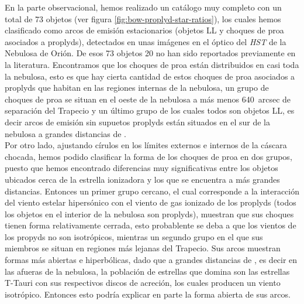 %


%

\label{chap:conclu}

En la parte observacional, hemos realizado un catálogo muy completo  con un total de 73 objetos (ver figura \ref{fig:bow-proplyd-star-ratios}), los cuales hemos clasificado como arcos de emisión estacionarios (objetos LL y choques de proa asociados a proplyds), detectados en unas imágenes en el óptico del \textit{HST} de la Nebulosa de Orión. De esos 73 objetos 20 no han sido reportados previamente en la literatura. Encontramos que los choques de proa están distribuidos en casi toda la nebulosa, esto es que hay cierta cantidad de  estos choques de proa asociados a proplyds que habitan en las regiones internas de la nebulosa, un grupo de choques de proa se situan en el oeste de la nebulosa a más menos 640~arcsec de separación del Trapecio y un último  grupo de los cuales todos son objetos LL, es decir arcos de emisión sin supuetos proplyds están situados en el sur de la nebulosa a grandes distancias de \thC{}.\\      

Por otro lado, ajustando círulos en los límites externos e internos de la cáscara chocada, hemos podido clasificar la forma de los choques de proa en dos grupos, puesto que hemos encontrado diferencias muy significativas entre los  objetos ubicados cerca de la estrella ionizadora  y los que se encuentra a más grandes distancias. Entonces un primer grupo cercano, el cual corresponde a  la interacción del viento estelar  hipersónico con el viento de gas ionizado de los proplyds (todos los objetos en el interior de la nebulosa son proplyds), muestran que sus choques tienen forma relativamente cerrada, esto probablente se deba a que los vientos de los propyds no son isotrópicos, mientras un segundo grupo en el que sus miembros se situan en regiones más lejanas del Trapecio. Sus arcos muestran formas más abiertas e hiperbólicas, dado que a grandes distancias de \thC{}, es decir en las afueras de la nebulosa, la población de estrellas que domina son las estrellas T-Tauri con sus respectivos discos de acreción, los cuales producen un viento isotrópico. Entonces esto podría explicar en parte la forma abierta de sus arcos.\\

